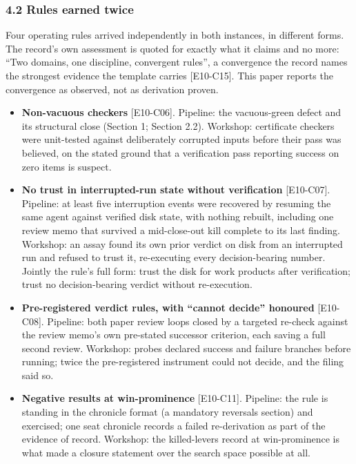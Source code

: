 \documentclass[
  11pt,
]{article}
\begin{document}
\subsubsection{4.2 Rules earned twice}\label{rules-earned-twice}

Four operating rules arrived independently in both instances, in
different forms. The record's own assessment is quoted for exactly what
it claims and no more: ``Two domains, one discipline, convergent
rules'', a convergence the record names the strongest evidence the
template carries {[}E10-C15{]}. This paper reports the convergence as
observed, not as derivation proven.

\begin{itemize}
\item
  \textbf{Non-vacuous checkers} {[}E10-C06{]}. Pipeline: the
  vacuous-green defect and its structural close (Section 1; Section
  2.2). Workshop: certificate checkers were unit-tested against
  deliberately corrupted inputs before their pass was believed, on the
  stated ground that a verification pass reporting success on zero items
  is suspect.
\item
  \textbf{No trust in interrupted-run state without verification}
  {[}E10-C07{]}. Pipeline: at least five interruption events were
  recovered by resuming the same agent against verified disk state, with
  nothing rebuilt, including one review memo that survived a
  mid-close-out kill complete to its last finding. Workshop: an assay
  found its own prior verdict on disk from an interrupted run and
  refused to trust it, re-executing every decision-bearing number.
  Jointly the rule's full form: trust the disk for work products after
  verification; trust no decision-bearing verdict without re-execution.
\item
  \textbf{Pre-registered verdict rules, with ``cannot decide'' honoured}
  {[}E10-C08{]}. Pipeline: both paper review loops closed by a targeted
  re-check against the review memo's own pre-stated successor criterion,
  each saving a full second review. Workshop: probes declared success
  and failure branches before running; twice the pre-registered
  instrument could not decide, and the filing said so.
\item
  \textbf{Negative results at win-prominence} {[}E10-C11{]}. Pipeline:
  the rule is standing in the chronicle format (a mandatory reversals
  section) and exercised; one seat chronicle records a failed
  re-derivation as part of the evidence of record. Workshop: the
  killed-levers record at win-prominence is what made a closure
  statement over the search space possible at all.
\end{itemize}
\end{document}
